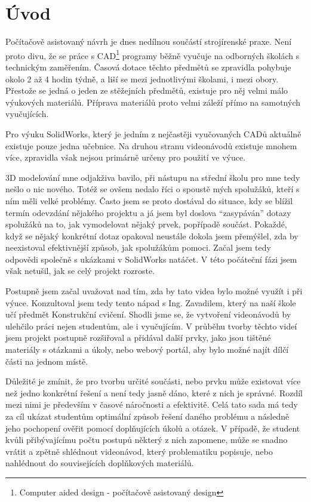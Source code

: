 \chapter*{Úvod}
Počítačově asistovaný návrh je dnes nedílnou součástí strojírenské praxe.
Není proto divu, že se práce s CAD\footnote{Computer aided design - počítačově asistovaný design} programy běžně vyučuje na odborných školách s technickým zaměřením.
Časová dotace těchto předmětů se zpravidla pohybuje okolo 2 až 4 hodin týdně, a liší se mezi jednotlivými školami, i mezi obory.
Přestože se jedná o jeden ze stěžejních předmětů, existuje pro něj velmi málo výukových materiálů.
Příprava materiálů proto velmi záleží přímo na samotných vyučujících.

Pro výuku SolidWorks, který je jedním z nejčastěji vyučovaných CADů aktuálně existuje pouze jedna učebnice.
Na druhou stranu videonávodů existuje mnohem více, zpravidla však nejsou primárně určeny pro použití ve výuce.

3D modelování mne odjakživa bavilo, při nástupu na střední školu pro mne tedy nešlo o nic nového.
Totéž se ovšem nedalo říci o spoustě mých spolužáků, kteří s ním měli velké problémy.
Často jsem se proto dostával do situace, kdy se blížil termín odevzdání nějakého projektu a já jsem byl doslova \enquote{zasypáván} dotazy spolužáků na to, jak vymodelovat nějaký prvek, popřípadě součást.
Pokaždé, když se nějaký konkrétní dotaz opakoval neustále dokola jsem přemýšlel, zda by neexistoval efektivnější způsob, jak spolužákům pomoci.
Začal jsem tedy odpovědi společně s ukázkami v SolidWorks natáčet.
V této počáteční fázi jsem však netušil, jak se celý projekt rozroste.

Postupně jsem začal uvažovat nad tím, zda by tato videa bylo možné využít i při výuce.
Konzultoval jsem tedy tento nápad s Ing. Zavadilem, který na naší škole učí předmět Konstrukční cvičení.
Shodli jsme se, že vytvoření videonávodů by ulehčilo práci nejen studentům, ale i vyučujícím.
V průběhu tvorby těchto videí jsem projekt postupně rozšiřoval a přidával další prvky, jako jsou tištěné materiály s otázkami a úkoly, nebo webový portál, aby bylo možné najít dílčí části na jednom místě.

Důležité je zmínit, že pro tvorbu určité součásti, nebo prvku může existovat více než jedno konkrétní řešení a není tedy jasně dáno, které z nich je správné.
Rozdíl mezi nimi je především v časové náročnosti a efektivitě.
Celá tato sada má tedy za cíl ukázat studentům optimální způsob řešení daného problému a následně jeho pochopení ověřit pomocí doplňujících úkolů a otázek.
V případě, že student kvůli přibývajícímu počtu postupů některý z nich zapomene, může se snadno vrátit a zpětně shlédnout videonávod, který problematiku popisuje, nebo nahlédnout do souvisejících doplňkových materiálů.

\newpage
